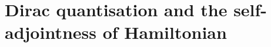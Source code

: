 \documentclass[8pt]{beamer}
\begin{document}
% 
% 
% 
% 
% 

\section{Dirac quantisation and the self-adjointness of Hamiltonian}
\end{document}
